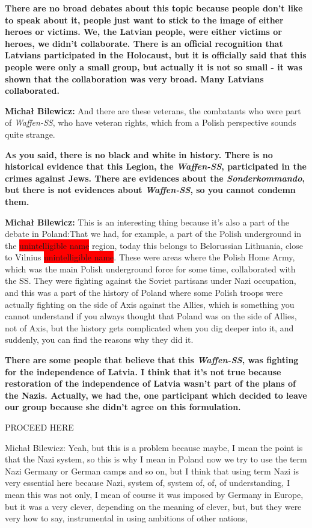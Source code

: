 \textbf{There are no broad debates about this topic because people don't like to speak about it, people just want to stick to the image of either heroes or victims. We, the Latvian people, were either victims or heroes,  we didn’t collaborate. There is an official recognition that Latvians participated in the Holocaust, but it is officially said that this people were only a small group, but actually it is not so small - it was shown that the collaboration was very broad. Many Latvians collaborated.} 

\textbf{Michał Bilewicz:} And there are these veterans, the combatants who were part of \textit{Waffen-SS}, who have veteran rights, which from a Polish perspective sounds quite strange. 

\textbf{As you said, there is no black and white in history. There is no historical evidence that this Legion, the \textit{Waffen-SS}, participated in the crimes against Jews. There are evidences about the \textit{Sonderkommando}, but there is not evidences about \textit{Waffen-SS}, so you cannot condemn them.}

\textbf{Michał Bilewicz:} This is an interesting thing because it's also a part of the debate in Poland:That we had, for example, a part of the Polish underground in the \colorbox{red}{unintelligible name} region, today this belongs to Belorussian Lithuania, close to Vilnius \colorbox{red}{unintelligible name}. These were areas where the Polish Home Army, which was the main Polish underground force for some time, collaborated with the SS. They were fighting against the Soviet partisans  under Nazi occupation, and this was a part of the history of Poland where some Polish troops were actually fighting on the side of Axis against the Allies, which is something you cannot understand if you always thought that Poland was on the side of Allies, not of Axis, but the history gets complicated when you dig deeper into it, and suddenly, you can find the reasons why they did it. 

\textbf{There are some people that believe that this \textit{Waffen-SS}, was fighting for the independence of Latvia. I think that it’s not true because restoration of the independence of Latvia wasn't part of the plans of the Nazis. Actually, we had the, one participant which decided to leave our group because she didn't agree on this formulation.} 

PROCEED HERE

Michał Bilewicz: Yeah, but this is a problem because maybe, I mean the point is that the Nazi system, so this is why I mean in Poland now we try to use the term Nazi Germany or German camps and so on, but I think that using term Nazi is very essential here because Nazi, system of, system of, of, of understanding, I mean this was not only, I mean of course it was imposed by Germany in Europe, but it was a very clever, depending on the meaning of clever, but, but they were very how to say, instrumental in using ambitions of other nations, 

